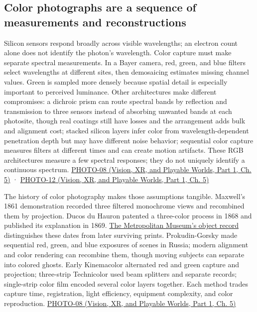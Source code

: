 \subsection{Color photographs are a sequence of measurements and reconstructions}\label{03-visual-computing-i-ch004-color-photographs-are-a-sequence-of-measurements-and-reconstructions}

\hypertarget{03-visual-computing-i-ch004-color-photographs-are-a-sequence-of-measurements-and-reconstructions}{}

Silicon sensors respond broadly across visible wavelengths; an electron count alone does not identify the photon's wavelength. Color capture must make separate spectral measurements. In a Bayer camera, red, green, and blue filters select wavelengths at different sites, then demosaicing estimates missing channel values. Green is sampled more densely because spatial detail is especially important to perceived luminance. Other architectures make different compromises: a dichroic prism can route spectral bands by reflection and transmission to three sensors instead of absorbing unwanted bands at each photosite, though real coatings still have losses and the arrangement adds bulk and alignment cost; stacked silicon layers infer color from wavelength-dependent penetration depth but may have different noise behavior; sequential color capture measures filters at different times and can create motion artifacts. These RGB architectures measure a few spectral responses; they do not uniquely identify a continuous spectrum. \href{../07-Vision-XR-and-Playable-Worlds-P01/main.pdf\#nameddest=04-visual-computing-ii-ch036-photo-08---photography-session-08}{PHOTO-08 (Vision, XR, and Playable Worlds, Part 1, Ch. 5)} · \href{../07-Vision-XR-and-Playable-Worlds-P01/main.pdf\#nameddest=04-visual-computing-ii-ch036-photo-12---photography-session-12}{PHOTO-12 (Vision, XR, and Playable Worlds, Part 1, Ch. 5)}

The history of color photography makes those assumptions tangible. Maxwell's 1861 demonstration recorded three filtered monochrome views and recombined them by projection. Ducos du Hauron patented a three-color process in 1868 and published its explanation in 1869. \href{https://www.metmuseum.org/art/collection/search/286318}{The Metropolitan Museum's object record} distinguishes these dates from later surviving prints. Prokudin-Gorsky made sequential red, green, and blue exposures of scenes in Russia; modern alignment and color rendering can recombine them, though moving subjects can separate into colored ghosts. Early Kinemacolor alternated red and green capture and projection; three-strip Technicolor used beam splitters and separate records; single-strip color film encoded several color layers together. Each method trades capture time, registration, light efficiency, equipment complexity, and color reproduction. \href{../07-Vision-XR-and-Playable-Worlds-P01/main.pdf\#nameddest=04-visual-computing-ii-ch036-photo-08---photography-session-08}{PHOTO-08 (Vision, XR, and Playable Worlds, Part 1, Ch. 5)}

